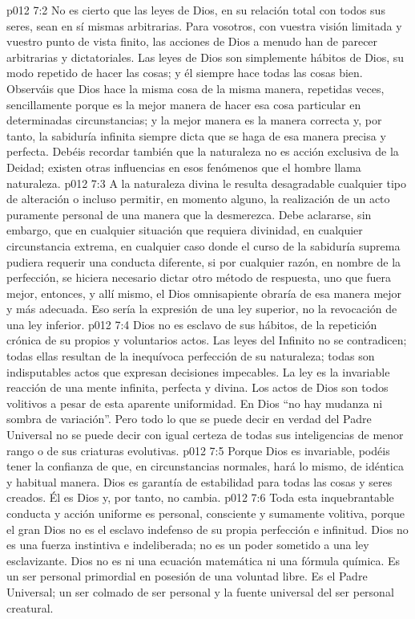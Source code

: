 \vs p012 7:2 \pc No es cierto que las leyes de Dios, en su relación total con todos sus seres, sean en sí mismas arbitrarias. Para vosotros, con vuestra visión limitada y vuestro punto de vista finito, las acciones de Dios a menudo han de parecer arbitrarias y dictatoriales. Las leyes de Dios son simplemente hábitos de Dios, su modo repetido de hacer las cosas; y él siempre hace todas las cosas bien. Observáis que Dios hace la misma cosa de la misma manera, repetidas veces, sencillamente porque es la mejor manera de hacer esa cosa particular en determinadas circunstancias; y la mejor manera es la manera correcta y, por tanto, la sabiduría infinita siempre dicta que se haga de esa manera precisa y perfecta. Debéis recordar también que la naturaleza no es acción exclusiva de la Deidad; existen otras influencias en esos fenómenos que el hombre llama naturaleza.
\vs p012 7:3 A la naturaleza divina le resulta desagradable cualquier tipo de alteración o incluso permitir, en momento alguno, la realización de un acto puramente personal de una manera que la desmerezca. Debe aclararse, sin embargo, que  en cualquier situación que requiera divinidad, en cualquier circunstancia extrema, en cualquier caso donde el curso de la sabiduría suprema pudiera requerir una conducta diferente, si por cualquier razón, en nombre de la perfección, se hiciera necesario dictar otro método de respuesta, uno que fuera mejor, entonces, y allí mismo, el Dios omnisapiente obraría de esa manera mejor y más adecuada. Eso sería la expresión de una ley superior, no la revocación de una ley inferior.
\vs p012 7:4 Dios no es esclavo de sus hábitos, de la repetición crónica de su propios y voluntarios actos. Las leyes del Infinito no se contradicen; todas ellas resultan de la inequívoca perfección de su naturaleza; todas son indisputables actos que expresan decisiones impecables. La ley es la invariable reacción de una mente infinita, perfecta y divina. Los actos de Dios son todos volitivos a pesar de esta aparente uniformidad. En Dios “no hay mudanza ni sombra de variación”. Pero todo lo que se puede decir en verdad del Padre Universal no se puede decir con igual certeza de todas sus inteligencias de menor rango o de sus criaturas evolutivas.
\vs p012 7:5 Porque Dios es invariable, podéis tener la confianza de que, en circunstancias normales, hará lo mismo, de idéntica y habitual manera. Dios es garantía de estabilidad para todas las cosas y seres creados. Él es Dios y, por tanto, no cambia.
\vs p012 7:6 Toda esta inquebrantable conducta y acción uniforme es personal, consciente y sumamente volitiva, porque el gran Dios no es el esclavo indefenso de su propia perfección e infinitud. Dios no es una fuerza instintiva e indeliberada; no es un poder sometido a una ley esclavizante. Dios no es ni una ecuación matemática ni una fórmula química. Es un ser personal primordial en posesión de una voluntad libre. Es el Padre Universal; un ser colmado de ser personal y la fuente universal del ser personal creatural.
